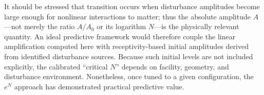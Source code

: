 It should be stressed that transition occurs when disturbance amplitudes become large enough for nonlinear interactions to matter; thus the absolute amplitude $A$—not merely the ratio $A/A_0$ or its logarithm $N$—is the physically relevant quantity. An ideal predictive framework would therefore couple the linear amplification computed here with receptivity-based initial amplitudes derived from identified disturbance sources. Because such initial levels are not included explicitly, the calibrated “critical $N$” depends on facility, geometry, and disturbance environment. Nonetheless, once tuned to a given configuration, the $e^N$ approach has demonstrated practical predictive value.





